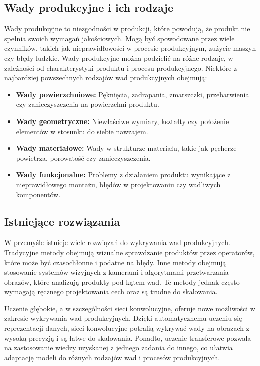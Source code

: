 \subsection{Wady produkcyjne i ich rodzaje}
Wady produkcyjne to niezgodności w produkcji, które powodują, że produkt nie spełnia swoich wymagań jakościowych. Mogą być spowodowane przez wiele czynników, takich jak nieprawidłowości w procesie produkcyjnym, zużycie maszyn czy błędy ludzkie. Wady produkcyjne można podzielić na różne rodzaje, w zależności od charakterystyki produktu i procesu produkcyjnego. Niektóre z najbardziej powszechnych rodzajów wad produkcyjnych obejmują:

\begin{itemize}
\item \textbf{Wady powierzchniowe:} Pęknięcia, zadrapania, zmarszczki, przebarwienia czy zanieczyszczenia na powierzchni produktu.
\item \textbf{Wady geometryczne:} Niewłaściwe wymiary, kształty czy położenie elementów w stosunku do siebie nawzajem.
\item \textbf{Wady materiałowe:} Wady w strukturze materiału, takie jak pęcherze powietrza, porowatość czy zanieczyszczenia.
\item \textbf{Wady funkcjonalne:} Problemy z działaniem produktu wynikające z nieprawidłowego montażu, błędów w projektowaniu czy wadliwych komponentów.
\end{itemize}

\subsection{Istniejące rozwiązania}
W przemyśle istnieje wiele rozwiązań do wykrywania wad produkcyjnych. Tradycyjne metody obejmują wizualne sprawdzanie produktów przez operatorów, które może być czasochłonne i podatne na błędy. Inne metody obejmują stosowanie systemów wizyjnych z kamerami i algorytmami przetwarzania obrazów, które analizują produkty pod kątem wad. Te metody jednak często wymagają ręcznego projektowania cech oraz są trudne do skalowania.

Uczenie głębokie, a w szczególności sieci konwolucyjne, oferuje nowe możliwości w zakresie wykrywania wad produkcyjnych. Dzięki automatycznemu uczeniu się reprezentacji danych, sieci konwolucyjne potrafią wykrywać wady na obrazach z wysoką precyzją i są łatwe do skalowania. Ponadto, uczenie transferowe pozwala na zastosowanie wiedzy uzyskanej z jednego zadania do innego, co ułatwia adaptację modeli do różnych rodzajów wad i procesów produkcyjnych.

